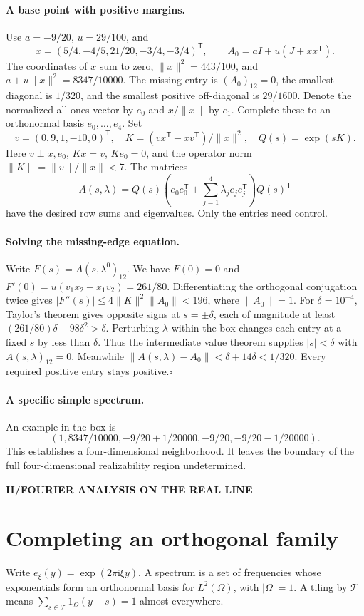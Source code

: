 \documentclass[11pt,a4paper]{article}
\newcommand{\kicker}[1]{\par{\sffamily\bfseries\color{teal}\small #1}\par}
\newcommand{\sect}[1]{\section*{#1}}
\begin{document}
\paragraph{A base point with positive margins.}
Use $a=-9/20$, $u=29/100$, and
\[
 x=(5/4,-4/5,21/20,-3/4,-3/4)^\mathsf T,\qquad
 A_0=aI+u(J+xx^\mathsf T).
\]
The coordinates of $x$ sum to zero, $\|x\|^2=443/100$, and $a+u\|x\|^2=8347/10000$. The missing entry is $(A_0)_{12}=0$, the smallest diagonal is $1/320$, and the smallest positive off-diagonal is $29/1600$. Denote the normalized all-ones vector by $e_0$ and $x/\|x\|$ by $e_1$. Complete these to an orthonormal basis $e_0,\ldots,e_4$. Set
\[
 v=(0,9,1,-10,0)^\mathsf T,\quad
 K=(vx^\mathsf T-xv^\mathsf T)/\|x\|^2,\quad Q(s)=\exp(sK).
\]
Here $v\perp x,e_0$, $Kx=v$, $Ke_0=0$, and the operator norm $\|K\|=\|v\|/\|x\|<7$. The matrices
\[
 A(s,\lambda)=Q(s)\left(e_0e_0^\mathsf T+\sum_{j=1}^4\lambda_j e_je_j^\mathsf T\right)Q(s)^\mathsf T
\]
have the desired row sums and eigenvalues. Only the entries need control.
\paragraph{Solving the missing-edge equation.}
Write $F(s)=A(s,\lambda^0)_{12}$. We have $F(0)=0$ and
$F'(0)=u(v_1x_2+x_1v_2)=261/80$. Differentiating the orthogonal conjugation twice gives $|F''(s)|\le4\|K\|^2\|A_0\|<196$, where $\|A_0\|=1$. For $\delta=10^{-4}$, Taylor's theorem gives opposite signs at $s=\pm\delta$, each of magnitude at least $(261/80)\delta-98\delta^2>\delta$. Perturbing $\lambda$ within the box changes each entry at a fixed $s$ by less than $\delta$. Thus the intermediate value theorem supplies $|s|<\delta$ with $A(s,\lambda)_{12}=0$. Meanwhile $\|A(s,\lambda)-A_0\|<\delta+14\delta<1/320$. Every required positive entry stays positive.\hfill$\square$
\paragraph{A specific simple spectrum.}
An example in the box is
\[ (1,8347/10000,-9/20+1/20000,-9/20,-9/20-1/20000). \]
 This establishes a four-dimensional neighborhood. It leaves the boundary of the full four-dimensional realizability region undetermined.
\clearpage
{}
\kicker{II\quad /\quad FOURIER ANALYSIS ON THE REAL LINE}
\sect{Completing an orthogonal family}
Write $e_\xi(y)=\exp(2\pi\mathrm i\xi y)$. A spectrum is a set of frequencies whose exponentials form an orthonormal basis for $L^2(\Omega)$, with $|\Omega|=1$. A tiling by $\mathcal T$ means $\sum_{s\in\mathcal T}1_\Omega(y-s)=1$ almost everywhere.
\end{document}
